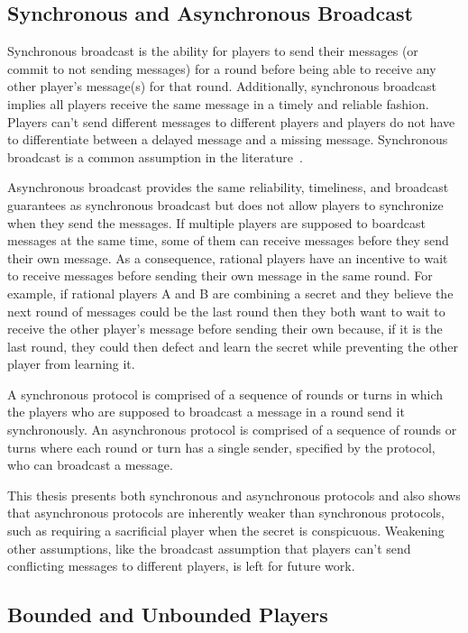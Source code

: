 \documentclass{dalcsthesis}
\begin{document}
\subsection{Synchronous and Asynchronous Broadcast}
\label{Def:Broadcast}

Synchronous broadcast is the ability for players to send their messages (or commit to not sending messages) for a round before being able to receive any other player's message(s) for that round. Additionally, synchronous broadcast implies all players receive the same message in a timely and reliable fashion. Players can't send different messages to different players and players do not have to differentiate between a delayed message and a missing message. Synchronous broadcast is a common assumption in the literature~\cite{fuch10, gordon06, halpern04, kol08-2, kol08, maleka08, ong09}.

Asynchronous broadcast provides the same reliability, timeliness, and broadcast guarantees as synchronous broadcast but does not allow players to synchronize when they send the messages. If multiple players are supposed to boardcast messages at the same time, some of them can receive messages before they send their own message. As a consequence, rational players have an incentive to wait to receive messages before sending their own message in the same round. For example, if rational players A and B are combining a secret and they believe the next round of messages could be the last round then they both want to wait to receive the other player's message before sending their own because, if it is the last round, they could then defect and learn the secret while preventing the other player from learning it.

A synchronous protocol is comprised of a sequence of rounds or turns in which the players who are supposed to broadcast a message in a round send it synchronously. An asynchronous protocol is comprised of a sequence of rounds or turns where each round or turn has a single sender, specified by the protocol, who can broadcast a message.

This thesis presents both synchronous and asynchronous protocols and also shows that asynchronous protocols are inherently weaker than synchronous protocols, such as requiring a sacrificial player when the secret is conspicuous. Weakening other assumptions, like the broadcast assumption that players can't send conflicting messages to different players, is left for future work.

\subsection{Bounded and Unbounded Players}
\end{document}
